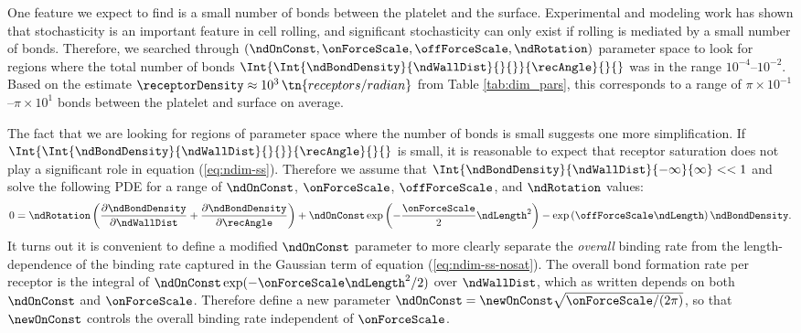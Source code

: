 One feature we expect to find is a small number of bonds between the
platelet and the surface. Experimental and modeling work has shown
that stochasticity is an important feature in cell rolling, and
significant stochasticity can only exist if rolling is mediated by a
small number of bonds. Therefore, we searched through
$(\ndOnConst,\onForceScale,\offForceScale,\ndRotation)$ parameter
space to look for regions where the total number of bonds
$\Int{\Int{\ndBondDensity}{\ndWallDist}{}{}}{\recAngle}{}{}$ was in
the range $10^{-4}$--$10^{-2}$. Based on the estimate
$\receptorDensity \approx 10^3 \, \tn{receptors/radian}$ from Table
\ref{tab:dim_pars}, this corresponds to a range of $\pi \times
10^{-1}$--$\pi \times 10^1$ bonds between the platelet and surface on
average. 

The fact that we are looking for regions of parameter space where the
number of bonds is small suggests one more simplification. If
$\Int{\Int{\ndBondDensity}{\ndWallDist}{}{}}{\recAngle}{}{}$ is small,
it is reasonable to expect that receptor saturation does not play a
significant role in equation (\ref{eq:ndim-ss}). Therefore we assume
that $\Int{\ndBondDensity}{\ndWallDist}{-\infty}{\infty} << 1$ and
solve the following PDE for a range of $\ndOnConst$, $\onForceScale$,
$\offForceScale$, and $\ndRotation$ values:
\begin{equation}
  \label{eq:ndim-ss-nosat}
  0 = \ndRotation
  \left(\frac{\partial\ndBondDensity}{\partial\ndWallDist} +
    \frac{\partial \ndBondDensity}{\partial\recAngle}\right) +
  \ndOnConst\exp\left(-\frac{\onForceScale}{2} \ndLength^2 \right) -
  \exp \left(\offForceScale \ndLength \right) \ndBondDensity.
\end{equation}
It turns out it is convenient to define a modified $\ndOnConst$
parameter to more clearly separate the \emph{overall} binding rate
from the length-dependence of the binding rate captured in the
Gaussian term of equation (\ref{eq:ndim-ss-nosat}). The overall bond
formation rate per receptor is the integral of
$\ndOnConst \exp(-\onForceScale \ndLength^2/2)$ over $\ndWallDist$,
which as written depends on both $\ndOnConst$ and
$\onForceScale$. Therefore define a new parameter
$\ndOnConst = \newOnConst \sqrt{\onForceScale/(2\pi)}$, so that
$\newOnConst$ controls the overall binding rate independent of
$\onForceScale$.

